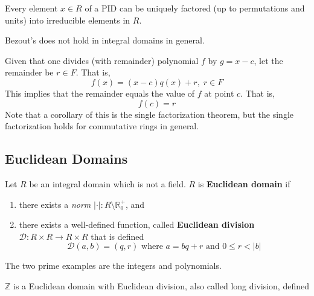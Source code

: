   \begin{theorem}
    Every element $x \in R$ of a PID can be uniquely factored (up to permutations and units) into irreducible elements in $R$. 
  \end{theorem}

  Bezout's does not hold in integral domains in general. 

  \begin{theorem}
    Given that one divides (with remainder) polynomial $f$ by $g = x - c$, let the remainder be $r \in F$. That is, 
    \begin{equation}
      f(x) = (x-c) q(x) + r, \; r \in F
    \end{equation}
    This implies that the remainder equals the value of $f$ at point $c$. That is, 
    \begin{equation}
      f(c) = r
    \end{equation}
    Note that a corollary of this is the single factorization theorem, but the single factorization holds for commutative rings in general. 
  \end{theorem} 

\subsection{Euclidean Domains}

  \begin{definition}
    Let $R$ be an integral domain which is not a field. $R$ is \textbf{Euclidean domain} if 
    \begin{enumerate}
      \item there exists a \textit{norm} $|\cdot|: R \setminus \mathbb{R}_0^+$, and  
      \item there exists a well-defined function, called \textbf{Euclidean division} $\mathcal{D}: R \times R \rightarrow R \times R$ that is defined 
      \begin{equation}
        \mathcal{D}(a, b) = (q, r) \text{ where } a = bq + r \text{ and } 0 \leq r < |b|
      \end{equation}
    \end{enumerate}
  \end{definition}

  The two prime examples are the integers and polynomials. 

  \begin{example}[Integers]
    $\mathbb{Z}$ is a Euclidean domain with Euclidean division, also called long division, defined 

    \begin{center}
    \end{center}
  \end{example}

